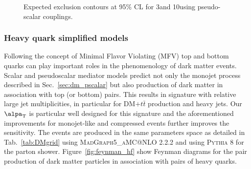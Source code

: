 \begin{figure}[h!]
  \centering
  \caption{\label{fig:limits_P} Expected exclusion contours at 95\% CL for 3\fbinv and 10\fbinv using pseudo-scalar couplings. }
\end{figure}


\clearpage
\subsubsection{Heavy quark simplified models}

Following the concept of Minimal Flavor Violating (MFV) top and bottom quarks can play important roles in the phenomenology of dark matter events.
Scalar and pseudoscalar mediator models predict not only the monojet process described in Sec.~\ref{sec:dm_pscalar} but also production of dark matter in association
with top (or bottom) pairs. This results in signature with relative large jet multiplicities, in particular for DM$+t\bar{t}$ production and heavy jets. Our $\alpa_{\textrm{T}}$ is particular well designed for this signature and the aforementioned improvements for monojet-like and compressed events further improves the sensitivity. The events are produced in the same parameters space as detailed in Tab.~\ref{tab:DMgrid} using \textsc{MadGraph5\_aMC@NLO} 2.2.2 and using \textsc{Pythia 8} for the parton shower. Figure~\ref{fig:feynman_hf} show Feynman diagrams for the pair production of dark matter particles in association with pairs of heavy quarks.


